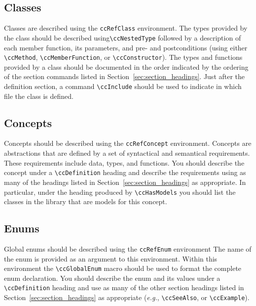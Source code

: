 \subsection{Classes}
\label{sec:ref_class}

Classes are described using the {\tt ccRefClass} environment.%
The types provided by the class should be described using\verb|\ccNestedType|
followed by a description
of each member function, its parameters, and pre- and postconditions (using 
either \verb|\ccMethod|, \verb|\ccMemberFunction|, or \verb|\ccConstructor|).
The types and functions provided by a class should be documented in the
order indicated by the ordering of the section commands listed in
Section~\ref{sec:section_headings}.
Just after the definition section, a command \verb|\ccInclude| should be
used to indicate in which file the class is defined.

\subsection{Concepts}
\label{sec:ref_concept}

Concepts should be described using the {\tt ccRefConcept} environment.%
Concepts are abstractions that are defined by a set of syntactical and
semantical requirements.  These requirements include data, types, and functions.
You should describe the concept under a \verb|\ccDefinition|
heading and describe the requirements using as many of the headings listed
in Section~\ref{sec:section_headings} as appropriate.  In particular, under
the heading produced by  \verb|\ccHasModels| you should list  the classes
in the library that are models for this concept.

\subsection{Enums}
\label{sec:ref_enums}

Global enums should be described using the {\tt ccRefEnum} environment%
The name of the enum is provided as an argument to this environment.
Within this environment the \verb|\ccGlobalEnum| macro should be used to
format the complete enum declaration.  You should describe the enum and
its values under a \verb|\ccDefinition| heading and use as many of the 
other section headings listed in Section~\ref{sec:section_headings} as 
appropriate ({\em e.g.}, \verb|\ccSeeAlso|, or \verb|\ccExample|).


